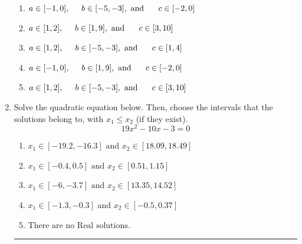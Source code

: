 \documentclass[14pt]{extbook}
\newcommand{\litem}[1]{\item#1\hspace*{-1cm}\rule{\textwidth}{0.4pt}}
\begin{document}
\begin{enumerate}
{\begin{center}
\end{center}
\begin{enumerate}[label=\Alph*.]
\item \( a \in [-1, 0], \hspace*{5mm} b \in [-5, -3], \text{ and } \hspace*{5mm} c \in [-2, 0] \)
\item \( a \in [1, 2], \hspace*{5mm} b \in [1, 9], \text{ and } \hspace*{5mm} c \in [3, 10] \)
\item \( a \in [1, 2], \hspace*{5mm} b \in [-5, -3], \text{ and } \hspace*{5mm} c \in [1, 4] \)
\item \( a \in [-1, 0], \hspace*{5mm} b \in [1, 9], \text{ and } \hspace*{5mm} c \in [-2, 0] \)
\item \( a \in [1, 2], \hspace*{5mm} b \in [-5, -3], \text{ and } \hspace*{5mm} c \in [3, 10] \)

\end{enumerate} }
\litem{
Solve the quadratic equation below. Then, choose the intervals that the solutions belong to, with $x_1 \leq x_2$ (if they exist).\[ 19x^{2} -10 x -3 = 0 \]\begin{enumerate}[label=\Alph*.]
\item \( x_1 \in [-19.2, -16.3] \text{ and } x_2 \in [18.09, 18.49] \)
\item \( x_1 \in [-0.4, 0.5] \text{ and } x_2 \in [0.51, 1.15] \)
\item \( x_1 \in [-6, -3.7] \text{ and } x_2 \in [13.35, 14.52] \)
\item \( x_1 \in [-1.3, -0.3] \text{ and } x_2 \in [-0.5, 0.37] \)
\item \( \text{There are no Real solutions.} \)


\end{enumerate}}
\end{enumerate}
\end{document}
